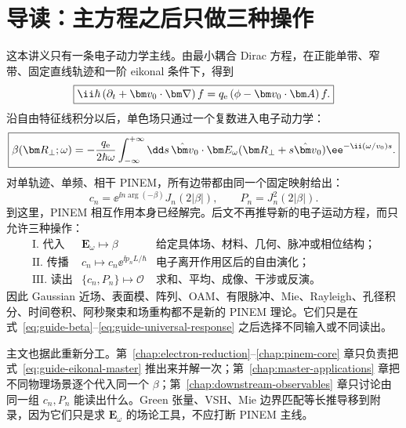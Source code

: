\chapter*{导读：主方程之后只做三种操作}
\label{chap:physical-map}

这本讲义只有一条电子动力学主线。由最小耦合 Dirac 方程，在正能单带、窄带、固定直线轨迹和一阶 eikonal 条件下，得到
\begin{equation}
\boxed{
\ii\hbar\left(\partial_t+\bm v_0\cdot\bm\nabla\right)f
=q_{\rm e}\left(\phi-\bm v_0\cdot\bm A\right)f.}
\label{eq:guide-eikonal-master}
\end{equation}
沿自由特征线积分以后，单色场只通过一个复数进入电子动力学：
\begin{equation}
\boxed{
\beta(\bm R_\perp;\omega)
=-\frac{q_{\rm e}}{2\hbar\omega}
\int_{-\infty}^{+\infty}\dd s\,
\hat{\bm v}_0\cdot\bm E_\omega(\bm R_\perp+s\hat{\bm v}_0)
\ee^{-\ii(\omega/v_0)s}.}
\label{eq:guide-beta}
\end{equation}
对单轨迹、单频、相干 PINEM，所有边带都由同一个固定映射给出：
\begin{equation}
\boxed{
 c_n=\ee^{\ii n\arg(-\beta)}J_n(2|\beta|),
 \qquad
 P_n=J_n^2(2|\beta|).}
\label{eq:guide-universal-response}
\end{equation}
到这里，PINEM 相互作用本身已经解完。后文不再推导新的电子运动方程，而只允许三种操作：
\begin{equation}
\boxed{
\begin{array}{lll}
\text{I. 代入} & \bm E_\omega\mapsto\beta & \text{给定具体场、材料、几何、脉冲或相位结构；}\\[0.4em]
\text{II. 传播} & c_n\mapsto c_n\ee^{\ii p_nL/\hbar} & \text{电子离开作用区后的自由演化；}\\[0.4em]
\text{III. 读出} & \{c_n,P_n\}\mapsto\mathcal O & \text{求和、平均、成像、干涉或反演。}
\end{array}}
\label{eq:three-downstream-operations}
\end{equation}
因此 Gaussian 近场、表面模、阵列、OAM、有限脉冲、Mie、Rayleigh、孔径积分、时间卷积、阿秒聚束和场重构都不是新的 PINEM 理论。它们只是在式~\eqref{eq:guide-beta}--\eqref{eq:guide-universal-response} 之后选择不同输入或不同读出。

主文也据此重新分工。第~\ref{chap:electron-reduction}--\ref{chap:pinem-core} 章只负责把式~\eqref{eq:guide-eikonal-master} 推出来并解一次；第~\ref{chap:master-applications} 章把不同物理场景逐个代入同一个 \(\beta\)；第~\ref{chap:downstream-observables} 章只讨论由同一组 \(c_n,P_n\) 能读出什么。Green 张量、VSH、Mie 边界匹配等长推导移到附录，因为它们只是求 \(\bm E_\omega\) 的场论工具，不应打断 PINEM 主线。


